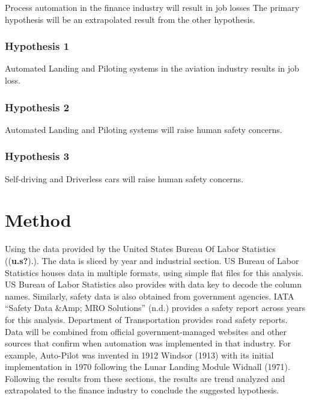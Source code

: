 \documentclass[
  man]{apa7}
\begin{document}
Process automation in the finance industry will result in job losses
The primary hypothesis will be an extrapolated result from the other hypothesis.

\hypertarget{hypothesis-1}{%
\subsubsection{Hypothesis 1}\label{hypothesis-1}}

Automated Landing and Piloting systems in the aviation industry results in job loss.

\hypertarget{hypothesis-2}{%
\subsubsection{Hypothesis 2}\label{hypothesis-2}}

Automated Landing and Piloting systems will raise human safety concerns.

\hypertarget{hypothesis-3}{%
\subsubsection{Hypothesis 3}\label{hypothesis-3}}

Self-driving and Driverless cars will raise human safety concerns.

\hypertarget{method}{%
\section{Method}\label{method}}

Using the data provided by the United States Bureau Of Labor Statistics ((\textbf{u.s?}).). The data is sliced by year and industrial section. US Bureau of Labor Statistics houses data in multiple formats, using simple flat files for this analysis. US Bureau of Labor Statistics also provides with data key to decode the column names. Similarly, safety data is also obtained from government agencies. IATA {``Safety Data \&Amp; MRO Solutions''} (n.d.) provides a safety report across years for this analysis. Department of Transportation provides road safety reports. Data will be combined from official government-managed websites and other sources that confirm when automation was implemented in that industry. For example, Auto-Pilot was invented in 1912 Windsor (1913) with its initial implementation in 1970 following the Lunar Landing Module Widnall (1971).\\
Following the results from these sections, the results are trend analyzed and extrapolated to the finance industry to conclude the suggested hypothesis.
\end{document}
